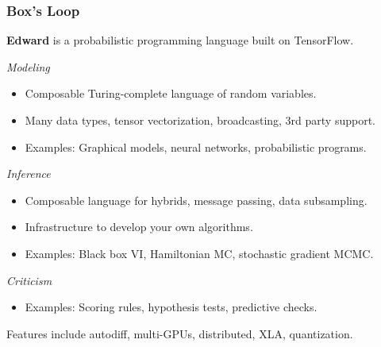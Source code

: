\documentclass[10pt,
               xcolor={usenames,dvipsnames},
               hyperref={colorlinks,linktoc=all,citecolor=Plum,linkcolor=MidnightBlue,urlcolor=MidnightBlue},noamssymb]{beamer}
\begin{document}
\begin{frame}
\frametitle{Box's Loop}
\end{frame}

\begin{frame}
\vspace{3ex}
\textbf{Edward} is a probabilistic programming language
built on TensorFlow.

\emph{Modeling}
\begin{itemize}
\item
Composable Turing-complete language of random variables.
\item
Many data types, tensor vectorization, broadcasting, 3rd party support.
\item
Examples:
Graphical models, neural networks, probabilistic programs.
\end{itemize}

\emph{Inference}
\begin{itemize}
\item
Composable language for hybrids, message passing, data subsampling.
\item
Infrastructure to develop your own algorithms.
\item
Examples:
Black box VI, Hamiltonian MC, stochastic
gradient MCMC.
\end{itemize}

\emph{Criticism}
\begin{itemize}
\item
Examples: Scoring rules, hypothesis tests, predictive checks.
\end{itemize}

\vspace{1ex}
Features include autodiff, multi-GPUs, distributed, XLA, quantization.

\end{frame}
\end{document}
